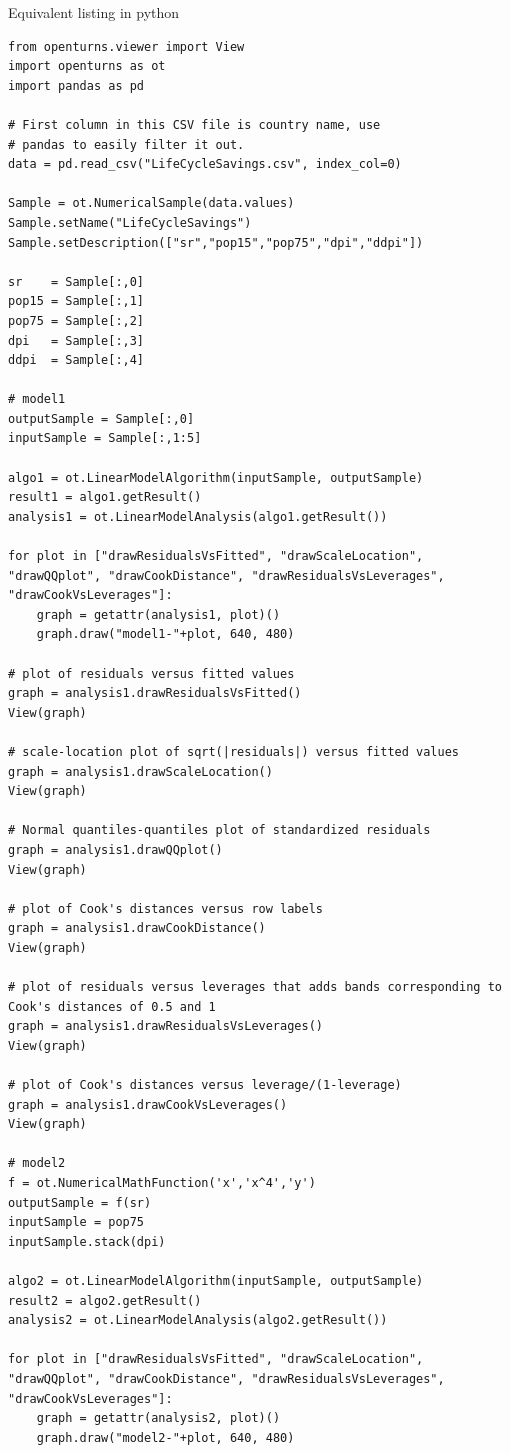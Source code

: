 Equivalent listing in python
\begin{lstlisting}[style=pythonStyle,basicstyle=\footnotesize]
from openturns.viewer import View
import openturns as ot
import pandas as pd

# First column in this CSV file is country name, use
# pandas to easily filter it out.
data = pd.read_csv("LifeCycleSavings.csv", index_col=0)

Sample = ot.NumericalSample(data.values)
Sample.setName("LifeCycleSavings")
Sample.setDescription(["sr","pop15","pop75","dpi","ddpi"])

sr    = Sample[:,0]
pop15 = Sample[:,1]
pop75 = Sample[:,2]
dpi   = Sample[:,3]
ddpi  = Sample[:,4]

# model1
outputSample = Sample[:,0]
inputSample = Sample[:,1:5]

algo1 = ot.LinearModelAlgorithm(inputSample, outputSample)
result1 = algo1.getResult()
analysis1 = ot.LinearModelAnalysis(algo1.getResult())

for plot in ["drawResidualsVsFitted", "drawScaleLocation", "drawQQplot", "drawCookDistance", "drawResidualsVsLeverages", "drawCookVsLeverages"]:
    graph = getattr(analysis1, plot)()
    graph.draw("model1-"+plot, 640, 480)

# plot of residuals versus fitted values
graph = analysis1.drawResidualsVsFitted()
View(graph)

# scale-location plot of sqrt(|residuals|) versus fitted values
graph = analysis1.drawScaleLocation()
View(graph)

# Normal quantiles-quantiles plot of standardized residuals
graph = analysis1.drawQQplot()
View(graph)

# plot of Cook's distances versus row labels
graph = analysis1.drawCookDistance()
View(graph)

# plot of residuals versus leverages that adds bands corresponding to Cook's distances of 0.5 and 1
graph = analysis1.drawResidualsVsLeverages()
View(graph)

# plot of Cook's distances versus leverage/(1-leverage)
graph = analysis1.drawCookVsLeverages()
View(graph)

# model2
f = ot.NumericalMathFunction('x','x^4','y')
outputSample = f(sr)
inputSample = pop75
inputSample.stack(dpi)

algo2 = ot.LinearModelAlgorithm(inputSample, outputSample)
result2 = algo2.getResult()
analysis2 = ot.LinearModelAnalysis(algo2.getResult())

for plot in ["drawResidualsVsFitted", "drawScaleLocation", "drawQQplot", "drawCookDistance", "drawResidualsVsLeverages", "drawCookVsLeverages"]:
    graph = getattr(analysis2, plot)()
    graph.draw("model2-"+plot, 640, 480)


\end{lstlisting}
